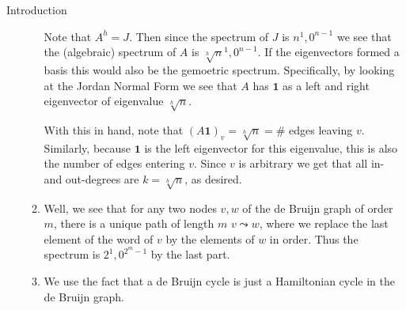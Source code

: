 \documentclass{article}
\begin{document}
\begin{section}{Introduction}
\begin{enumerate}
\begin{enumerate}
	  Note that $A^h = J$.
	  Then since the spectrum of $J$ is $n^1, 0^{n-1}$ we see that the (algebraic) spectrum of $A$ is $\sqrt[h]{n}^1, 0^{n-1}$.
	  If the eigenvectors formed a basis this would also be the gemoetric spectrum.
	  Specifically, by looking at the Jordan Normal Form we see that $A$ has $\mathbf 1$ as a left and right eigenvector of eigenvalue $\sqrt[h]{n}$.

	  With this in hand, note that $(A\mathbf 1)_v = \sqrt[h]{n} = \#$ edges leaving $v$.
	  Similarly, because $\mathbf 1$ is the left eigenvector for this eigenvalue, this is also the number of edges entering $v$.
	  Since $v$ is arbitrary we get that all in- and out-degrees are $k = \sqrt[h]{n}$, as desired.
	\item
	  Well, we see that for any two nodes $v,w$ of the de Bruijn graph of order $m$, there is a unique path of length $m$ $v \leadsto w$, where we replace the last element of the word of $v$ by the elements of $w$ in order.
	  Thus the spectrum is $2^1, 0^{2^m - 1}$ by the last part.
	\item
	  We use the fact that a de Bruijn cycle is just a Hamiltonian cycle in the de Bruijn graph.
	  
      \end{enumerate}

  \end{enumerate}
\end{section}
\end{document}
